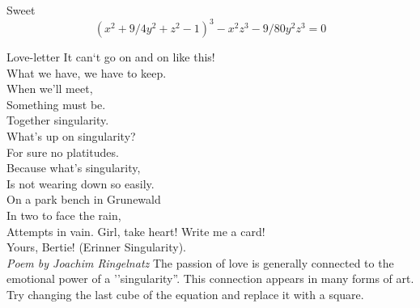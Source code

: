 \begin{surferPage}{Sweet}
\[(x^2+ 9/4y^2	+ z^2- 1)^3- x^2z^3	- 9/80y^2z^3	= 0\]

\singlespacing
Love-letter
\singlespacing
It can`t go on and on like this!\\
What we have, we have to keep.\\
When we'll meet,\\
Something must be.\\
Together singularity.\\
What's up on singularity?\\
For sure no platitudes.\\
Because what's singularity,\\
Is not wearing down so easily.\\
On a park bench in Grunewald\\
In two to face the rain,\\
Attempts in vain. Girl, take heart! Write me a card!\\
Yours, Bertie! (Erinner Singularity).\\
{\it Poem by Joachim Ringelnatz}
\singlespacing 
The passion of love is generally connected to the emotional power of a ''singularity''. This connection appears in many forms of art.
\singlespacing 
Try changing the last cube of the equation and replace it with a square.
\end{surferPage}
